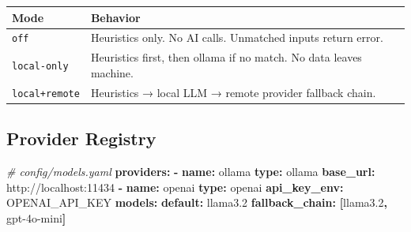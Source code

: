 \documentclass[
]{article}
\newenvironment{Shaded}{\begin{snugshade}}{\end{snugshade}}
\newcommand{\AttributeTok}[1]{\textcolor[rgb]{0.13,0.29,0.53}{#1}}
\newcommand{\CommentTok}[1]{\textcolor[rgb]{0.56,0.35,0.01}{\textit{#1}}}
\newcommand{\FloatTok}[1]{\textcolor[rgb]{0.00,0.00,0.81}{#1}}
\newcommand{\FunctionTok}[1]{\textcolor[rgb]{0.13,0.29,0.53}{\textbf{#1}}}
\newcommand{\KeywordTok}[1]{\textcolor[rgb]{0.13,0.29,0.53}{\textbf{#1}}}
\newcounter{none} %
\begin{document}
{\def\LTcaptype{none} %
\begin{longtable}[]{@{}
  >{\raggedright\arraybackslash}p{}
  >{\raggedright\arraybackslash}p{}@{}}
\toprule\noalign{}
\begin{minipage}[b]{\linewidth}\raggedright
Mode
\end{minipage} & \begin{minipage}[b]{\linewidth}\raggedright
Behavior
\end{minipage} \\
\midrule\noalign{}
\endhead
\bottomrule\noalign{}
\endlastfoot
\texttt{off} & Heuristics only. No AI calls. Unmatched inputs return
error. \\
\texttt{local-only} & Heuristics first, then ollama if no match. No data
leaves machine. \\
\texttt{local+remote} & Heuristics → local LLM → remote provider
fallback chain. \\
\end{longtable}
}

\subsection{Provider Registry}\label{provider-registry}

\begin{Shaded}
\begin{Highlighting}[]
\CommentTok{\# config/models.yaml}
\FunctionTok{providers}\KeywordTok{:}
\AttributeTok{  }\KeywordTok{{-}}\AttributeTok{ }\FunctionTok{name}\KeywordTok{:}\AttributeTok{ ollama}
\AttributeTok{    }\FunctionTok{type}\KeywordTok{:}\AttributeTok{ ollama}
\AttributeTok{    }\FunctionTok{base\_url}\KeywordTok{:}\AttributeTok{ http://localhost:11434}
\AttributeTok{  }\KeywordTok{{-}}\AttributeTok{ }\FunctionTok{name}\KeywordTok{:}\AttributeTok{ openai}
\AttributeTok{    }\FunctionTok{type}\KeywordTok{:}\AttributeTok{ openai}
\AttributeTok{    }\FunctionTok{api\_key\_env}\KeywordTok{:}\AttributeTok{ OPENAI\_API\_KEY}
\FunctionTok{models}\KeywordTok{:}
\AttributeTok{  }\FunctionTok{default}\KeywordTok{:}\AttributeTok{ llama3.2}
\AttributeTok{  }\FunctionTok{fallback\_chain}\KeywordTok{:}\AttributeTok{ }\KeywordTok{[}\AttributeTok{llama3}\FloatTok{.2}\KeywordTok{,}\AttributeTok{ gpt{-}4o{-}mini}\KeywordTok{]}
\end{Highlighting}
\end{Shaded}
\end{document}

